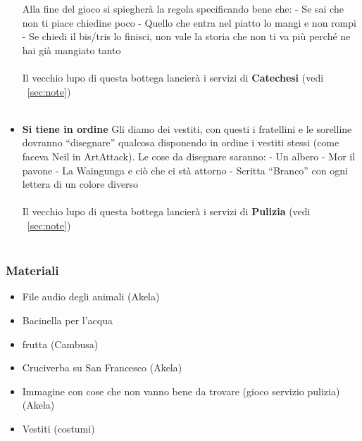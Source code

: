 \documentclass[../main.tex]{subfiles}
\begin{document}
\begin{itemize}
Alla fine del gioco si spiegherà la regola specificando
bene che:
- Se sai che non ti piace chiedine poco
- Quello che entra nel piatto lo mangi e non rompi
- Se chiedi il bis/tris lo finisci, non vale la storia che non ti va più perché ne hai già mangiato tanto\\
            \\
            Il vecchio lupo di questa bottega lancierà i servizi di \textbf{Catechesi} (vedi ~\ref{sec:note})\\
            \\
        \item
         \textbf{Si tiene in ordine}
Gli diamo dei vestiti, con questi i fratellini e le sorelline dovranno “disegnare” qualcosa disponendo in ordine i vestiti stessi (come faceva Neil in ArtAttack).
Le cose da disegnare saranno:
- Un albero
- Mor il pavone
- La Waingunga e ciò che ci stà attorno
- Scritta “Branco” con ogni lettera di un colore diverso\\
            \\
            Il vecchio lupo di questa bottega lancierà i servizi di \textbf{Pulizia} (vedi ~\ref{sec:note})\\
            \\
        \end{itemize}
        
        \subsubsection{Materiali}
            \begin{itemize}
                \item File audio degli animali  (Akela)
                \item Bacinella per l'acqua
                \item frutta (Cambusa)
                \item Cruciverba su San Francesco (Akela)
                \item Immagine con cose che non vanno bene da trovare (gioco servizio pulizia)    (Akela)
                \item Vestiti (costumi)
            \end{itemize}
\end{document}
